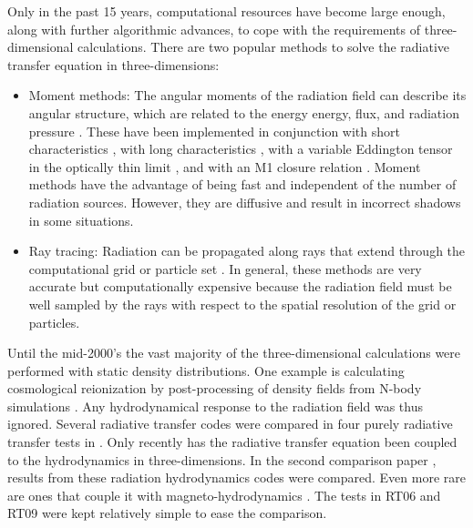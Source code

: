 \documentclass[useAMS,usenatbib,a4paper]{mn2e}
\begin{document}
Only in the past 15 years, computational resources have become large
enough, along with further algorithmic advances, to cope with the
requirements of three-dimensional calculations.  There are two popular
methods to solve the radiative transfer equation in three-dimensions:
%
\begin{itemize}
\item Moment methods: The angular moments of the radiation field can
  describe its angular structure, which are related to the energy
  energy, flux, and radiation pressure \citep{Auer70, Norman98}.
  These have been implemented in conjunction with short
  characteristics \citep[2D]{Stone92_RHD}, with long characteristics
  \citep{Finlator09}, with a variable Eddington tensor in the
  optically thin limit \citep[OTVET;][]{Gnedin01_OTVET, Petkova09},
  and with an M1 closure relation \citep{Gonzalez07, Aubert08}.
  Moment methods have the advantage of being fast and independent of
  the number of radiation sources.  However, they are diffusive and
  result in incorrect shadows in some situations.
\item Ray tracing:  Radiation can be propagated along rays that extend
  through the computational grid \citep[e.g.][]{Razoumov99, Abel99_RT,
    Ciardi01, Sokasian01, Whalen06, Rijkhorst06, Mellema06, Alvarez06,
    Trac07, Krumholz07_ART, Paardekooper10} or particle set
  \citep[e.g.][]{Susa06, Johnson07, Pawlik08, Pawlik10, Altay08,
    Hasegawa09}.  In general, these methods are very accurate but
  computationally expensive because the radiation field must be well
  sampled by the rays with respect to the spatial resolution of the
  grid or particles.
\end{itemize}
%
Until the mid-2000's the vast majority of the three-dimensional
calculations were performed with static density distributions.  One
example is calculating cosmological reionization by post-processing of
density fields from N-body simulations \citep{Ciardi01, Sokasian01,
  McQuinn07, Iliev06, Iliev07}.  Any hydrodynamical response to the
radiation field was thus ignored.  Several radiative transfer codes
were compared in four purely radiative transfer tests in
\citet[hereafter RT06]{RT06}.  Only recently has the radiative
transfer equation been coupled to the hydrodynamics in
three-dimensions.  In the second comparison paper \citep[hereafter
  RT09]{Iliev09}, results from these radiation hydrodynamics codes
were compared.  Even more rare are ones that couple it with
magneto-hydrodynamics \citep[e.g.][]{Krumholz07_ART}.  The tests in
RT06 and RT09 were kept relatively simple to ease the comparison.
\end{document}
